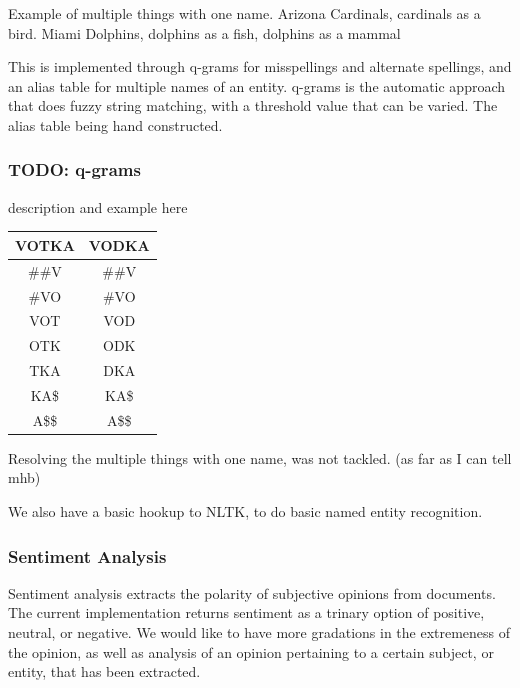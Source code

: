 \documentclass{article}
\begin{document}
\begin{enumerate}
    Example of multiple things with one name.
    Arizona Cardinals, cardinals as a bird.
    Miami Dolphins, dolphins as a fish, dolphins as a mammal


    This is implemented through q-grams for misspellings and alternate spellings,
    and an alias table for multiple names of an entity.
    q-grams is the automatic approach that does fuzzy string matching,
    with a threshold value that can be varied.
    The alias table being hand constructed.


    \subsubsection{TODO: q-grams}
    \label{qgram}

    description and example here

    \begin{tabular}{cc}
      VOTKA & VODKA \\ \hline
      {\color{green}\#\#V} & {\color{green}\#\#V} \\
      {\color{green}\#VO} & {\color{green}\#VO} \\
      {\color{red}VOT} &  {\color{red}VOD} \\
      {\color{red} OTK} &{\color{red} ODK} \\
      {\color{red} TKA} &{\color{red} DKA} \\
      {\color{green}KA\$} & {\color{green}KA\$} \\
      {\color{green}A\$\$} &  {\color{green}A\$\$} \\
    \end{tabular}

    Resolving the multiple things with one name, was not tackled. (as far as I can tell mhb)

    We also have a basic hookup to NLTK, to do basic named entity recognition.

    \subsubsection{Sentiment Analysis}
    \label{sec:SCSA}

    Sentiment analysis extracts the polarity of subjective opinions from documents.
    The current implementation returns sentiment as a trinary option of positive, neutral, or negative.
    We would like to have more gradations in the extremeness of the opinion,
    as well as analysis of an opinion pertaining to a certain subject, or entity, that has been extracted.


\end{enumerate}
\end{document}
